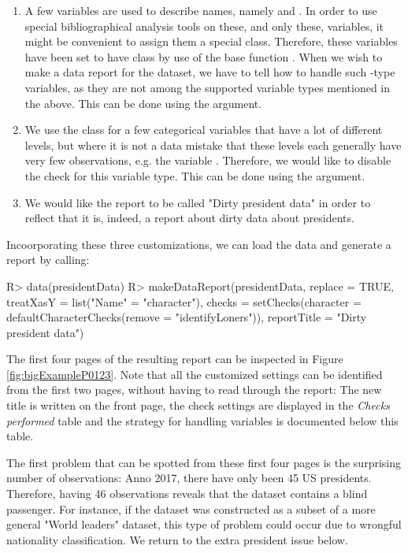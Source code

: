 \documentclass[article,shortnames]{jss}
\begin{document}
\begin{enumerate}
\item A few variables are used to describe names, namely  and . In order to use special bibliographical analysis tools on these, and only these, variables, it might be convenient to assign them a special class. Therefore, these variables have been set to have class  by use of the base  function . When we wish to make a data report for the dataset, we have to tell  how to handle such -type variables, as they are not among the supported variable types mentioned in the above. This can be done using the  argument.
\item We use the  class for a few categorical variables that have a lot of different levels, but where it is not a data mistake that these levels each generally have very few observations, e.g. the variable . Therefore, we would like to disable the  check for this variable type. This can be done using the  argument.
\item We would like the report to be called "Dirty president data" in order to reflect that it is, indeed, a report about dirty data about presidents.
\end{enumerate}
Incoorporating these three customizations, we can load the data and generate a report by calling:
\begin{Schunk}
\begin{Sinput}
R> data(presidentData)
R> makeDataReport(presidentData, replace = TRUE, 
   treatXasY = list("Name" = "character"),
   checks = setChecks(character = defaultCharacterChecks(remove = "identifyLoners")),
   reportTitle = "Dirty president data")
\end{Sinput}
\end{Schunk}
The first four pages of the resulting report can be inspected in Figure \ref{fig:bigExampleP0123}. Note that all the customized settings can be identified from the first two pages, without having to read through the report: The new title is written on the front page, the check settings are displayed in the \textit{Checks performed} table and the strategy for handling  variables is documented below this table. 

The first problem that can be spotted from these first four pages is the surprising number of observations: Anno 2017, there have only been 45 US presidents. Therefore, having 46 observations reveals that the dataset contains a blind passenger. For instance, if the dataset was constructed as a subset of a more general "World leaders" dataset, this type of problem could occur due to wrongful nationality classification. We return to the extra president issue below. 
\end{document}
